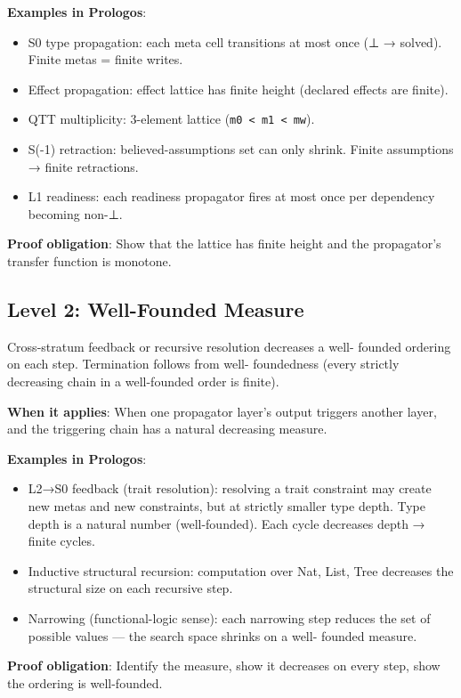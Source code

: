 \documentclass[11pt]{article}
\begin{document}
\textbf{Examples in Prologos}:
\begin{itemize}
\item S0 type propagation: each meta cell transitions at most once (⊥ →
solved). Finite metas = finite writes.
\item Effect propagation: effect lattice has finite height (declared
effects are finite).
\item QTT multiplicity: 3-element lattice (\texttt{m0 < m1 < mw}).
\item S(-1) retraction: believed-assumptions set can only shrink. Finite
assumptions → finite retractions.
\item L1 readiness: each readiness propagator fires at most once per
dependency becoming non-⊥.
\end{itemize}

\textbf{Proof obligation}: Show that the lattice has finite height and the
propagator's transfer function is monotone.
\subsection{Level 2: Well-Founded Measure}
\label{sec:orgd274b95}

Cross-stratum feedback or recursive resolution decreases a well-
founded ordering on each step. Termination follows from well-
foundedness (every strictly decreasing chain in a well-founded order
is finite).

\textbf{When it applies}: When one propagator layer's output triggers another
layer, and the triggering chain has a natural decreasing measure.

\textbf{Examples in Prologos}:
\begin{itemize}
\item L2→S0 feedback (trait resolution): resolving a trait constraint may
create new metas and new constraints, but at strictly smaller type
depth. Type depth is a natural number (well-founded). Each cycle
decreases depth → finite cycles.
\item Inductive structural recursion: computation over Nat, List, Tree
decreases the structural size on each recursive step.
\item Narrowing (functional-logic sense): each narrowing step reduces the
set of possible values --- the search space shrinks on a well-
founded measure.
\end{itemize}

\textbf{Proof obligation}: Identify the measure, show it decreases on every
step, show the ordering is well-founded.
\end{document}
